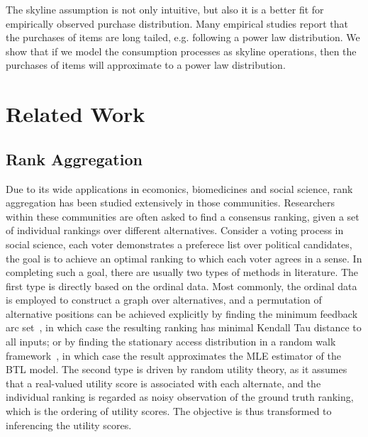 \documentclass{sig-alternate}
\begin{document}
The skyline assumption is not only intuitive, but also it is a better fit for empirically observed purchase distribution. Many empirical studies report that the purchases of items are long tailed, e.g. following a power law distribution. We show that if we model the consumption processes as skyline operations, then the purchases of items will approximate to a power law distribution. 

\section{Related Work}
\subsection{Rank Aggregation}
Due to its wide applications in ecomonics, biomedicines and social science, rank aggregation has been studied extensively in those communities. Researchers within these communities are often asked to find a consensus ranking, given a set of individual rankings over different alternatives. Consider a voting process in social science, each voter demonstrates a preferece list over political candidates, the goal is to achieve an optimal ranking to which each voter agrees in a sense.  In completing such a goal, there are usually two types of methods in literature. The first type is directly based on the ordinal data. Most commonly, the ordinal data is employed to construct a graph over alternatives, and a permutation of alternative positions can be achieved explicitly by finding the minimum feedback arc set~\cite{Alon2006Ranking}, in which case the resulting ranking has minimal Kendall Tau distance to all inputs; or by finding the stationary access distribution in a random walk framework~\cite{Negahban2012Iterative}, in which case the result approximates the MLE estimator of the BTL model. The second type is driven by random utility theory, as it assumes that a real-valued utility score is associated with each alternate, and the individual ranking is regarded as noisy observation of the ground truth ranking, which is the ordering of utility scores. The objective is thus transformed to inferencing the utility scores.         
\end{document}
